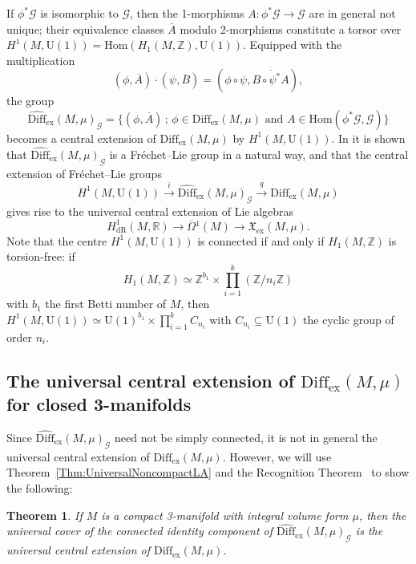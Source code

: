 \documentclass{article}
\newcommand{\ex}{\mathrm{ex}}
\newcommand{\dR}{\mathrm{dR}}
\newcommand{\fX}{\mathfrak{X}}
\newcommand{\Z}{\mathbb{Z}}
\newcommand{\R}{\mathbb{R}}
\newcommand{\Diff}{\mathrm{Diff}}
\newcommand{\oline}{\overline}
\newcommand{\cG}{\mathcal{G}}
\newcommand{\U}{\mathrm{U}}
\newtheorem{Theorem}{Theorem}[section]
\theoremstyle{definition}
\begin{document}
If $\phi^*\cG$ is isomorphic to $\cG$, then the 1-morphisms $A \colon \phi^*\cG \rightarrow \cG$ are in general not unique;
their equivalence classes $\overline{A}$ modulo 2-morphisms constitute a torsor over $H^1(M,\U(1)) = \mathrm{Hom}(H_1(M,\Z),\U(1))$.
Equipped with the multiplication 
\[
(\phi, \oline{A})\cdot (\psi, \oline{B}) = (\phi\circ \psi, \oline{B\circ \psi^*A}), 
\]
the group 
\begin{equation}
\widehat{\Diff}_{\ex}(M,\mu)_{\cG} = \{(\phi, \overline{A})\,;\, \phi \in \Diff_{\ex}(M,\mu) \text{ and } A \in \mathrm{Hom}(\phi^*\cG, \cG)\}
\end{equation}
becomes a central extension of $\Diff_{\ex}(M,\mu)$ by $H^1(M,\U(1))$. In \cite{janssensHowActionThat2024} it is shown that 
$\widehat{\Diff}_{\ex}(M,\mu)_{\cG}$ is a Fr\'echet--Lie group in a natural way, and that the central extension of Fr\'echet--Lie groups
\begin{equation}
H^1(M,\U(1)) \stackrel{i}{\longrightarrow} \widehat{\Diff}_{\ex}(M,\mu)_{\cG}  \stackrel{q}{\longrightarrow} \Diff_{\ex}(M,\mu)
\end{equation}
gives rise to the universal central extension of Lie algebras
\begin{equation}
H_{\dR}^1(M,\R) \rightarrow \oline{\Omega}{}^1(M) \rightarrow \fX_{\ex}(M,\mu).
\end{equation}
Note that the centre $H^1(M,\U(1))$ is connected if and only if $H_1(M,\Z)$ is torsion-free: if
\[\textstyle{H_1(M,\Z) \simeq \Z^{b_1} \times \prod_{i=1}^{k}(\Z/ n_i\Z)}\] 
with $b_1$ the first Betti number of $M$, then 
 $H^1(M,\U(1)) \simeq \U(1)^{b_1} \times \prod_{i=1}^{k}C_{n_i}$ with $C_{n_i} \subseteq \U(1)$ the cyclic group of order $n_i$.

\subsection{\texorpdfstring{The universal central extension of $\Diff_{\ex}(M,\mu)$ for closed 3-manifolds}{The universal central group extension for closed 3-manifolds}}

Since $\widehat{\Diff}_{\ex}(M,\mu)_{\cG}$ need not be simply connected, it is not in general the universal central extension of $\Diff_{\ex}(M,\mu)$.
However, we will use Theorem~\ref{Thm:UniversalNoncompactLA} and the Recognition Theorem~\cite{Neeb2002} to show the following:
\begin{Theorem}\label{Thm:MainTheoremGroups}
If $M$ is a compact 3-manifold with integral volume form $\mu$, then
the universal cover of the connected identity component of $\widehat{\Diff}_{\ex}(M,\mu)_{\cG}$ is the universal central extension of $\Diff_{\ex}(M,\mu)$.
\end{Theorem}
\end{document}

